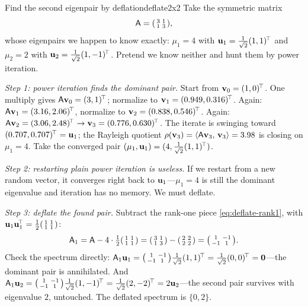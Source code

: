 \begin{workedexample}{Find the second eigenpair by deflation}{deflate2x2}
Take the symmetric matrix
\[
  \mathsf{A} = \begin{psmallmatrix} 3 & 1 \\ 1 & 3 \end{psmallmatrix},
\]
whose eigenpairs we happen to know exactly: $\mu_1=4$ with
$\mathbf{u}_1=\tfrac1{\sqrt2}(1,1)^{\!\top}$ and $\mu_2=2$ with
$\mathbf{u}_2=\tfrac1{\sqrt2}(1,-1)^{\!\top}$. Pretend we know neither and hunt them by
power iteration.

\smallskip
\emph{Step 1: power iteration finds the dominant pair.} Start from
$\mathbf{v}_0=(1,0)^{\!\top}$. One multiply gives $\mathsf{A}\mathbf{v}_0=(3,1)^{\!\top}$; normalize
to $\mathbf{v}_1=(0.949,0.316)^{\!\top}$. Again: $\mathsf{A}\mathbf{v}_1=(3.16,2.06)^{\!\top}$,
normalize to $\mathbf{v}_2=(0.838,0.546)^{\!\top}$. Again:
$\mathsf{A}\mathbf{v}_2=(3.06,2.48)^{\!\top}\to\mathbf{v}_3=(0.776,0.630)^{\!\top}$. The iterate is
swinging toward $(0.707,0.707)^{\!\top}=\mathbf{u}_1$; the Rayleigh quotient
$\rho(\mathbf{v}_3)=\left\langle \mathsf{A}\mathbf{v}_3,\, \mathbf{v}_3\right\rangle=3.98$ is closing on $\mu_1=4$. Take the
converged pair $(\mu_1,\mathbf{u}_1)=(4,\tfrac1{\sqrt2}(1,1)^{\!\top})$.

\smallskip
\emph{Step 2: restarting plain power iteration is useless.} If we restart from a
new random vector, it converges right back to $\mathbf{u}_1$---$\mu_1=4$ is still the
dominant eigenvalue and iteration has no memory. We must deflate.

\smallskip
\emph{Step 3: deflate the found pair.} Subtract the rank-one piece
\cref{eq:deflate-rank1}, with $\mathbf{u}_1\mathbf{u}_1^{\!\top}=\tfrac12
\begin{psmallmatrix}1&1\\1&1\end{psmallmatrix}$:
\[
  \mathsf{A}_1 = \mathsf{A} - 4\cdot\tfrac12\begin{psmallmatrix}1&1\\1&1\end{psmallmatrix}
    = \begin{psmallmatrix}3&1\\1&3\end{psmallmatrix}
      - \begin{psmallmatrix}2&2\\2&2\end{psmallmatrix}
    = \begin{psmallmatrix}1&-1\\-1&1\end{psmallmatrix}.
\]
Check the spectrum directly: $\mathsf{A}_1\mathbf{u}_1=\begin{psmallmatrix}1&-1\\-1&1
\end{psmallmatrix}\tfrac1{\sqrt2}(1,1)^{\!\top}=\tfrac1{\sqrt2}(0,0)^{\!\top}
=\mathbf 0$---the dominant pair is annihilated. And
$\mathsf{A}_1\mathbf{u}_2=\begin{psmallmatrix}1&-1\\-1&1\end{psmallmatrix}\tfrac1{\sqrt2}
(1,-1)^{\!\top}=\tfrac1{\sqrt2}(2,-2)^{\!\top}=2\mathbf{u}_2$---the second pair survives
with eigenvalue $2$, untouched. The deflated spectrum is $\{0,2\}$.


\end{workedexample}

